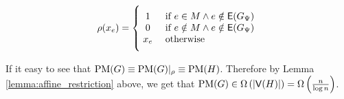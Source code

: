\documentclass[11pt]{article}
\begin{document}
\begin{enumerate}
{	\[
        \rho(x_e)=
        \Bigger[10]\{\begin{array}{@{}cl}
                1 & \text{ if $e \in M \land e \notin \Edges{G_{\EmbeddingFunc}}$} \\
          0 & \text{ if $e \notin M \land e \notin \Edges{G_{\EmbeddingFunc}}$}\\
                x_e & \text{ otherwise} 
        \end{array}
\]

	If it easy to see that $\text{PM}(G) \equiv \text{PM}(G)|_\rho \equiv \text{PM}(H)$. Therefore by Lemma \ref{lemma:affine_restriction} above, we get that $\text{PM}(G) \in \Omega\left(|\mathsf{V}(H)|\right) = \Omega\left(\frac{n}{\log n}\right)$. 
}
  \end{enumerate}






  


\end{document}
